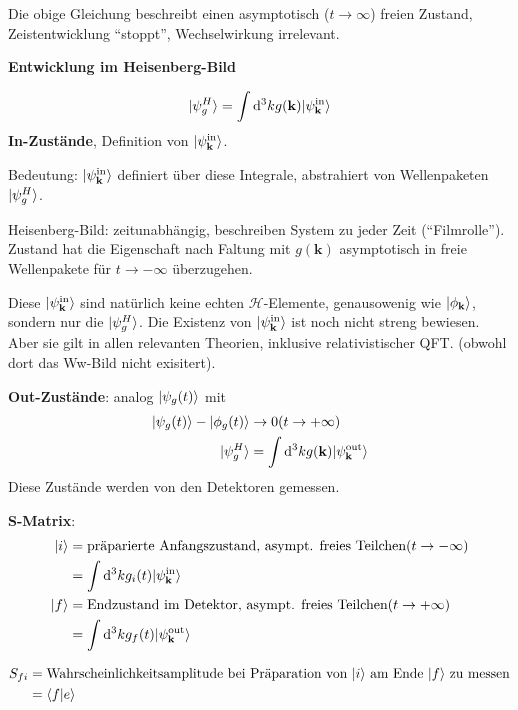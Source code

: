 \documentclass[11pt,a4paper]{report}
\begin{document}
Die obige Gleichung beschreibt einen asymptotisch ($t\rightarrow \infty$) freien Zustand, Zeistentwicklung ``stoppt'', Wechselwirkung irrelevant.

\textbf{Entwicklung im Heisenberg-Bild}

\begin{align*}
    |\psi_g^H\rangle = \int \mathrm{d}^3 k g(\mathbf{k}) |\psi_{\mathbf{k}}^{\text{in}}\rangle
\end{align*}
\textbf{In-Zustände}, Definition von $|\psi_{\mathbf{k}}^{\text{in}}\rangle$.

Bedeutung: $|\psi_{\mathbf{k}}^{\text{in}}\rangle$ definiert über diese Integrale, abstrahiert von Wellenpaketen $|\psi_g^H\rangle$.

Heisenberg-Bild: zeitunabhängig, beschreiben System zu jeder Zeit (``Filmrolle''). 
Zustand hat die Eigenschaft nach Faltung mit $g(\mathbf{k})$ asymptotisch in freie Wellenpakete für $t \rightarrow -\infty$ überzugehen.

Diese $|\psi_{\mathbf{k}}^{\text{in}}\rangle$ sind natürlich keine echten $\mathcal{H}$-Elemente, genausowenig wie $|\phi_{\mathbf{k}}\rangle$, sondern nur die $|\psi_g^H\rangle$.
Die Existenz von $|\psi_{\mathbf{k}}^{\text{in}}\rangle$ ist noch nicht streng bewiesen.
Aber sie gilt in allen relevanten Theorien, inklusive relativistischer QFT. (obwohl dort das Ww-Bild nicht exisitert).

\textbf{Out-Zustände}: analog $|\psi_g(t)\rangle$ mit 
\begin{align*}
    |\psi_g(t)\rangle - |\phi_g(t)\rangle &\rightarrow 0 (t \rightarrow +\infty) \\
    |\psi_g^H\rangle &= \int \mathrm{d}^3 k g(\mathbf{k}) |\psi_{\mathbf{k}}^{\text{out}}\rangle
\end{align*}
Diese Zustände werden von den Detektoren gemessen.

\textbf{S-Matrix}:
\begin{align*}
    |i\rangle&= \text{präparierte Anfangszustand, asympt. freies Teilchen} (t \rightarrow -\infty) \\
    &= \int \mathrm{d}^3 k g_i(t) |\psi_{\mathbf{k}}^{\text{in}}\rangle\\
    |f\rangle&= \text{Endzustand im Detektor, asympt. freies Teilchen} (t \rightarrow +\infty) \\
    &= \int \mathrm{d}^3 k g_f(t) |\psi_{\mathbf{k}}^{\text{out}}\rangle
\end{align*}

\begin{align*}
    S_{f i} &= \text{Wahrscheinlichkeitsamplitude bei Präparation von } |i\rangle \text{ am Ende } |f\rangle \text{ zu messen} \\
    &= \langle f|e\rangle
\end{align*}
\end{document}
